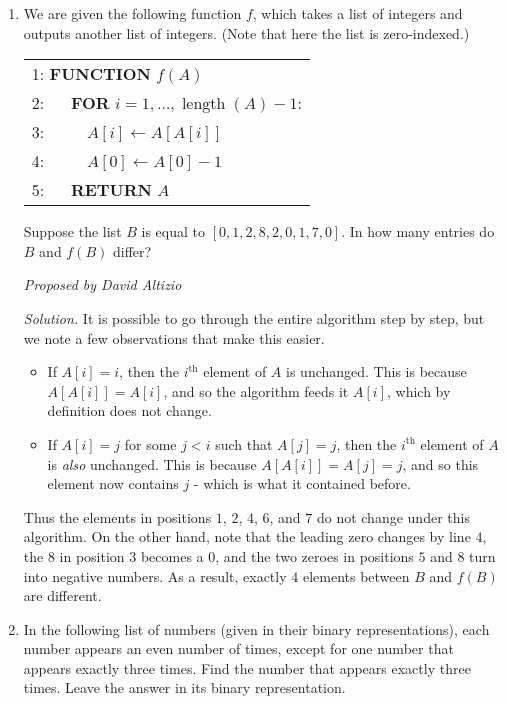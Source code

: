 \documentclass[10pt]{article}
\newcommand{\proposed}[1]
{
\vspace{5pt}
\noindent\textit{Proposed by #1}
}
\newcommand{\solution}
{
\vspace{5pt}
\noindent\textit{Solution.}\qquad
}
\begin{document}
\begin{enumerate}
\item We are given the following function $f$, which takes a list of integers and outputs another list of integers.  (Note that here the list is zero-indexed.)

\begin{tabular}{l}
1: \textbf{FUNCTION} $f(A)$ \\
2: $\quad$ \textbf{FOR} $i=1,\ldots, \operatorname{length}(A)-1$: \\
3: $\quad\quad$ $A[i]\leftarrow A[A[i]]$ \\
4: $\quad\quad$ $A[0]\leftarrow A[0]-1$ \\
5: $\quad$ \textbf{RETURN} $A$
\end{tabular}

\par Suppose the list $B$ is equal to $[0,1,2,8,2,0,1,7,0]$.  In how many entries do $B$ and $f(B)$ differ?

\proposed{David Altizio}

\solution It is possible to go through the entire algorithm step by step, but we note a few observations that make this easier.

\begin{itemize}

\item If $A[i]=i$, then the $i^{\text{th}}$ element of $A$ is unchanged.  This is because $A[A[i]] = A[i]$, and so the algorithm feeds it $A[i]$, which by definition does not change.

\item If $A[i]=j$ for some $j<i$ such that $A[j]=j$, then the $i^{\text{th}}$ element of $A$ is \textit{also} unchanged.  This is because $A[A[i]] = A[j] = j$, and so this element now contains $j$ - which is what it contained before.

\end{itemize}

Thus the elements in positions $1$, $2$, $4$, $6$, and $7$ do not change under this algorithm.  On the other hand, note that the leading zero changes by line $4$, the $8$ in position $3$ becomes a $0$, and the two zeroes in positions $5$ and $8$ turn into negative numbers.  As a result, exactly $\boxed 4$ elements between $B$ and $f(B)$ are different.




\item In the following list of numbers (given in their binary representations), each number appears an even number of times, except for one number that appears exactly three times. Find the number that appears exactly three times. Leave the answer in its binary representation.


\end{enumerate}
\end{document}
